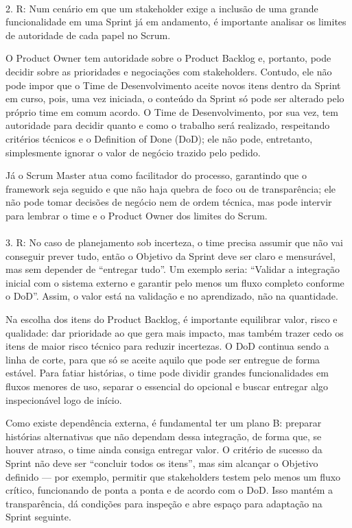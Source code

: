 \documentclass[12pt,a4paper]{article}
\begin{document}
\paragraph{}

2. R: Num cenário em que um stakeholder exige a inclusão de uma grande funcionalidade em
uma Sprint já em andamento, é importante analisar os limites de autoridade de cada papel
no Scrum.

O Product Owner tem autoridade sobre o Product Backlog e, portanto, pode decidir
sobre as prioridades e negociações com stakeholders. Contudo, ele não pode impor que o
Time de Desenvolvimento aceite novos itens dentro da Sprint em curso, pois, uma vez
iniciada, o conteúdo da Sprint só pode ser alterado pelo próprio time em comum acordo.
O Time de Desenvolvimento, por sua vez, tem autoridade para decidir quanto e como
o trabalho será realizado, respeitando critérios técnicos e o Definition of Done (DoD); ele não
pode, entretanto, simplesmente ignorar o valor de negócio trazido pelo pedido.

Já o Scrum Master atua como facilitador do processo, garantindo que o framework
seja seguido e que não haja quebra de foco ou de transparência; ele não pode tomar
decisões de negócio nem de ordem técnica, mas pode intervir para lembrar o time e o
Product Owner dos limites do Scrum.

\paragraph{}

3. R: No caso de planejamento sob incerteza, o time precisa assumir que não vai conseguir
prever tudo, então o Objetivo da Sprint deve ser claro e mensurável, mas sem depender de
“entregar tudo”. Um exemplo seria: “Validar a integração inicial com o sistema externo e
garantir pelo menos um fluxo completo conforme o DoD”. Assim, o valor está na validação e
no aprendizado, não na quantidade.

Na escolha dos itens do Product Backlog, é importante equilibrar valor, risco e qualidade: dar
prioridade ao que gera mais impacto, mas também trazer cedo os itens de maior risco
técnico para reduzir incertezas. O DoD continua sendo a linha de corte, para que só se
aceite aquilo que pode ser entregue de forma estável. Para fatiar histórias, o time pode
dividir grandes funcionalidades em fluxos menores de uso, separar o essencial do opcional e
buscar entregar algo inspecionável logo de início.

Como existe dependência externa, é fundamental ter um plano B: preparar histórias
alternativas que não dependam dessa integração, de forma que, se houver atraso, o time
ainda consiga entregar valor. O critério de sucesso da Sprint não deve ser “concluir todos os
itens”, mas sim alcançar o Objetivo definido — por exemplo, permitir que stakeholders
testem pelo menos um fluxo crítico, funcionando de ponta a ponta e de acordo com o DoD.
Isso mantém a transparência, dá condições para inspeção e abre espaço para adaptação na
Sprint seguinte.
\end{document}
